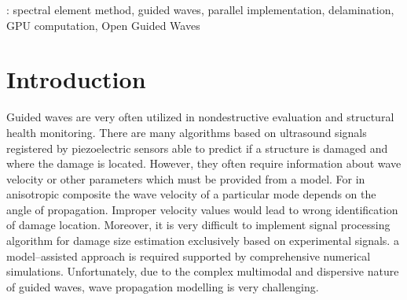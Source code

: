 %
\vspace{2pc}
: spectral element method, guided waves, parallel implementation, delamination, GPU computation, Open Guided Waves\\

%
\submitto{\SMS}
%
% 
%
\section{Introduction}
\label{sec1}

Guided waves are very often utilized in nondestructive evaluation and structural health monitoring. There are many algorithms based on ultrasound signals registered by piezoelectric sensors able to predict if a structure is damaged and where the damage is located. However, they often require information about wave velocity or other parameters which must be provided from a model. For   in anisotropic composite   the wave velocity of a particular mode depends on the angle of propagation. Improper velocity values would lead to  wrong identification of damage location.  Moreover, it is very difficult to implement signal processing algorithm for damage size estimation exclusively based on experimental signals.   a model--assisted approach is required supported by comprehensive numerical simulations. Unfortunately, due to the complex multimodal and dispersive nature of guided waves, wave propagation modelling is very challenging. 

